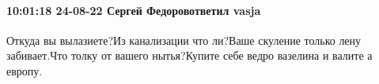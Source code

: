  
 
 
 
 

\paragraph{10:01:18 24-08-22 Сергей Федоровответил vasja}

Откуда вы вылазиете?Из канализации что ли?Ваше скуление только лену
забивает.Что толку от вашего нытья?Купите себе ведро вазелина и валите а
европу.
